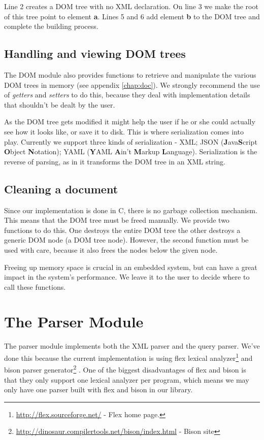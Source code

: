 \documentclass[a4paper]{report}
\begin{document}
		Line 2 creates a DOM tree with no XML declaration. On line 3 we make the root of this tree point to element \textbf{a}. Lines 5 and 6 add element \textbf{b} to the DOM tree and complete the building process.
		
	\subsection{Handling and viewing DOM trees}
		The DOM module also provides functions to retrieve and manipulate the various DOM trees in memory (see appendix \ref{chap:doc}). We strongly recommend the use of \emph{getters} and \emph{setters} to do this,
		because they deal with implementation details that shouldn't be dealt by the user.
		
		As the DOM tree gets modified it might help the user if he or she could actually see how it looks like, or save it to disk. This is where serialization comes into play. Currently we support three kinds of serialization - XML; 
		JSON (\textbf{J}ava\textbf{S}cript \textbf{O}bject \textbf{N}otation); YAML (\textbf{Y}AML \textbf{A}in't \textbf{M}arkup \textbf{L}anguage). Serialization is the reverse of parsing, as in it transforms the DOM tree in an XML
		string.
		
	\subsection{Cleaning a document}
		Since our implementation is done in C, there is no garbage collection mechanism. This means that the DOM tree must be freed manually. We provide two functions to do this. One destroys the entire DOM tree the 
		other destroys a generic DOM node (a DOM tree node). However, the second function must be used with care, because it also frees the nodes below the given node.
		
		Freeing up memory space is crucial in an embedded system, but can have a great impact in the system's performance. We leave it to the user to decide where to call these functions.

\section{The Parser Module}\label{sec:parser}
	The parser module implements both the XML parser and the query parser. We've done this because the current implementation is using flex lexical analyzer\footnote{\url{http://flex.sourceforge.net/} - Flex home page.} and 
	bison parser generator\footnote{\url{http://dinosaur.compilertools.net/bison/index.html} - Bison site} . One of the biggest disadvantages of flex and bison is that they only support one lexical analyzer per program, which 
	means we may only have one parser built with flex and bison in our library.
	
\end{document}
